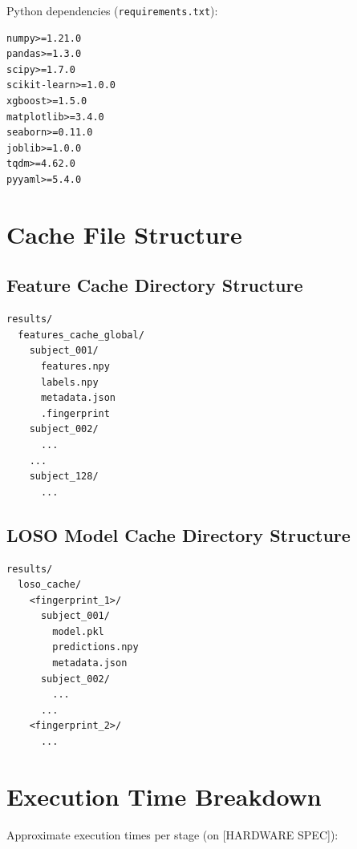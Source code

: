 Python dependencies (\texttt{requirements.txt}):

\begin{lstlisting}
numpy>=1.21.0
pandas>=1.3.0
scipy>=1.7.0
scikit-learn>=1.0.0
xgboost>=1.5.0
matplotlib>=3.4.0
seaborn>=0.11.0
joblib>=1.0.0
tqdm>=4.62.0
pyyaml>=5.4.0
\end{lstlisting}


\section{Cache File Structure}
\label{app:cache_structure}

\subsection{Feature Cache Directory Structure}
\label{app:feature_cache_structure}

\begin{lstlisting}
results/
  features_cache_global/
    subject_001/
      features.npy
      labels.npy
      metadata.json
      .fingerprint
    subject_002/
      ...
    ...
    subject_128/
      ...
\end{lstlisting}

\subsection{LOSO Model Cache Directory Structure}
\label{app:loso_cache_structure}

\begin{lstlisting}
results/
  loso_cache/
    <fingerprint_1>/
      subject_001/
        model.pkl
        predictions.npy
        metadata.json
      subject_002/
        ...
      ...
    <fingerprint_2>/
      ...
\end{lstlisting}

\section{Execution Time Breakdown}
\label{app:execution_time}


Approximate execution times per stage (on [HARDWARE SPEC]):

